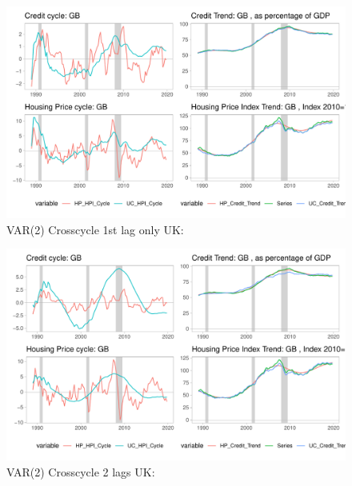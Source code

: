 \documentclass[12pt]{article}
\begin{document}
\begin{outline}[enumerate]
\begin{figure}[h!]
%		
%		
			\caption{VAR(2) Crosscycle 1st lag only UK: }	
			\centerline{\includegraphics[scale=0.7]{../../Regression/VAR_2_crosscycle_1stlagonly/Output/Graphs/HP_Credit_4graphs_GB.pdf}}
		\end{figure}
		
		\clearpage
		
		\begin{figure}[h!]
			\caption{VAR(2) Crosscycle 2 lags UK: }	
			\centerline{\includegraphics[scale=0.7]{../../Regression/VAR_2_crosscycle/Output/Graphs/HP_Credit_4graphs_GB.pdf}}
		\end{figure}
		
		\clearpage


\end{outline}
\end{document}
